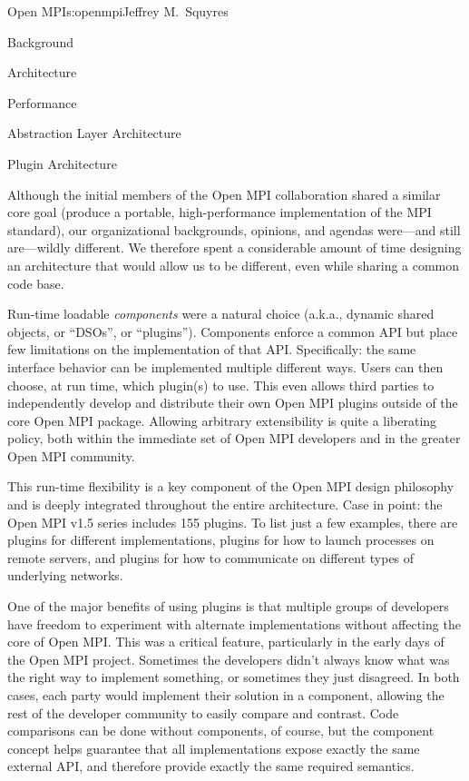 \begin{aosachapter}{Open MPI}{s:openmpi}{Jeffrey M.\ Squyres}
\begin{aosasect1}{Background}
\begin{aosasect1}{Architecture}
\begin{aosasect2}{Performance}
\begin{aosasect2}{Abstraction Layer Architecture}
\end{aosasect2}


\begin{aosasect2}{Plugin Architecture}


Although the initial members of the Open MPI collaboration shared a
similar core goal (produce a portable, high-performance
implementation of the MPI standard), our organizational backgrounds,
opinions, and agendas were---and still are---wildly different.
%
We therefore spent a considerable amount of time designing an
architecture that would allow us to be different, even while sharing
a common code base.

Run-time loadable \emph{components} were a natural choice (a.k.a.,
dynamic shared objects, or ``DSOs'', or ``plugins'').  Components
enforce a common API but place few limitations on the implementation
of that API.
%
Specifically: the same interface behavior can be implemented multiple
different ways.
%
Users can then choose, at run time, which plugin(s) to use.
%
This even allows third parties to independently develop and distribute
their own Open MPI plugins outside of the core Open MPI package.
%
Allowing arbitrary extensibility is quite a liberating policy, both
within the immediate set of Open MPI developers and in the greater
Open MPI community.

This run-time flexibility is a key component of the Open MPI design
philosophy and is deeply integrated throughout the entire
architecture.
%
Case in point: the Open MPI v1.5 series includes 155 plugins.
%
To list just a few examples, there are plugins for different  
implementations, plugins for how to launch processes on
remote servers, and plugins for how to communicate on different types
of underlying networks.

One of the major benefits of using plugins is that multiple groups of
developers have freedom to experiment with alternate implementations
without affecting the core of Open MPI.
%
This was a critical feature, particularly in the early days of the
Open MPI project.  Sometimes the developers didn't always know what
was the right way to implement something, or sometimes they just
disagreed.
%
In both cases, each party would implement their solution in a
component, allowing the rest of the developer community to easily
compare and contrast. 
%
Code comparisons can be done without components, of course, but the
component concept helps guarantee that all implementations expose
exactly the same external API, and therefore provide exactly the same
required semantics.  


\end{aosasect2}
\end{aosasect2}
\end{aosasect1}
\end{aosasect1}
\end{aosachapter}
